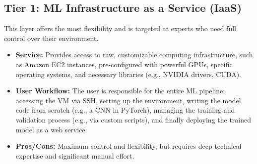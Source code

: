 
\subsection{Tier 1: ML Infrastructure as a Service (IaaS)}
This layer offers the most flexibility and is targeted at experts who need full control over their environment.
\begin{itemize}
    \item \textbf{Service:} Provides access to raw, customizable computing infrastructure, such as Amazon EC2 instances, pre-configured with powerful GPUs, specific operating systems, and necessary libraries (e.g., NVIDIA drivers, CUDA).
    \item \textbf{User Workflow:} The user is responsible for the entire ML pipeline: accessing the VM via SSH, setting up the environment, writing the model code from scratch (e.g., a CNN in PyTorch), managing the training and validation process (e.g., via custom scripts), and finally deploying the trained model as a web service.
    \item \textbf{Pros/Cons:} Maximum control and flexibility, but requires deep technical expertise and significant manual effort.
\end{itemize}

